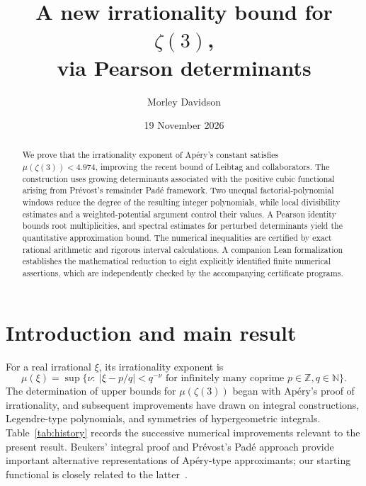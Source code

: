\documentclass[11pt]{article}
\title{\textbf{A new irrationality bound for $\zeta(3)$,\\
via Pearson determinants}}
\author{Morley Davidson}
\date{19 November 2026}
\theoremstyle{definition}\newtheorem{definition}[theorem]{Definition}
\theoremstyle{remark}\newtheorem{remark}[theorem]{Remark}
\begin{document}
\maketitle
\begin{abstract}
We prove that the irrationality exponent of Ap\'ery's constant satisfies $\mu(\zeta(3))<4.974$, improving the recent bound of Leibtag and collaborators. The construction uses growing determinants associated with the positive cubic functional arising from Pr\'evost's remainder Pad\'e framework. Two unequal factorial-polynomial windows reduce the degree of the resulting integer polynomials, while local divisibility estimates and a weighted-potential argument control their values. A Pearson identity bounds root multiplicities, and spectral estimates for perturbed determinants yield the quantitative approximation bound. The numerical inequalities are certified by exact rational arithmetic and rigorous interval calculations. A companion Lean formalization establishes the mathematical reduction to eight explicitly identified finite numerical assertions, which are independently checked by the accompanying certificate programs.
\end{abstract}
\clearpage
\tableofcontents
\newpage
\section{Introduction and main result}\label{sec:intro}
For a real irrational $\xi$, its irrationality exponent is
\[
 \mu(\xi)=\sup\{\nu:\ |\xi-p/q|<q^{-\nu}
       \text{ for infinitely many coprime }p\in\mathbb Z,q\in\mathbb N\}.
\]
The determination of upper bounds for $\mu(\zeta(3))$ began with Ap\'ery's proof of irrationality, and subsequent improvements have drawn on integral constructions, Legendre-type polynomials, and symmetries of hypergeometric integrals. Table~\ref{tab:history} records the successive numerical improvements relevant to the present result. Beukers' integral proof and Pr\'evost's Pad\'e approach provide important alternative representations of Ap\'ery-type approximants; our starting functional is closely related to the latter~\cite{apery,beukers,prevost}.
\end{document}
